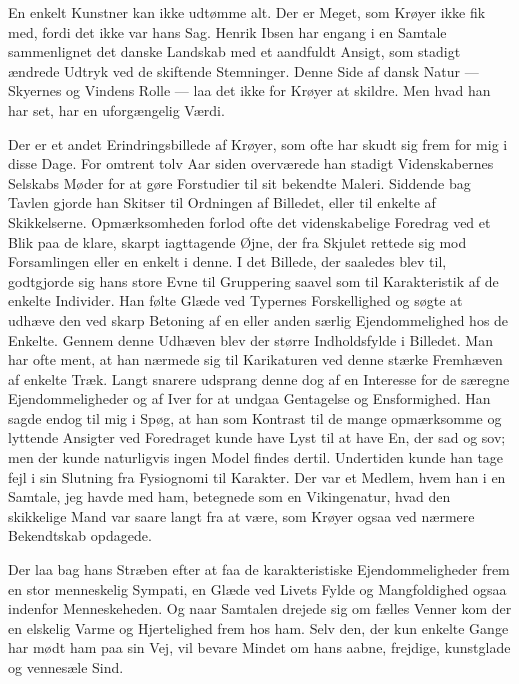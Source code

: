 \documentclass[12pt,a4paper,openany]{book}
\newcommand{\opage}[1]{\marginnote{\footnotesize\textit{[#1]}}}
\begin{document}
En enkelt Kunstner kan ikke udtømme alt. Der er Meget,
som Krøyer ikke fik med, fordi det ikke var hans Sag. Henrik
Ibsen har engang i en Samtale sammenlignet det danske Landskab
med et aandfuldt Ansigt, som stadigt ændrede Udtryk ved
de skiftende Stemninger. Denne Side af dansk Natur --- Skyernes
og Vindens Rolle --- laa det ikke for Krøyer at skildre.
Men hvad han har set, har en uforgængelig Værdi.

\setcounter{footnote}{0}%
\opage{200}Der er et andet Erindringsbillede af Krøyer, som ofte har
skudt sig frem for mig i disse Dage. For omtrent tolv Aar
siden overværede han stadigt Videnskabernes Selskabs Møder
for at gøre Forstudier til sit bekendte Maleri. Siddende bag
Tavlen gjorde han Skitser til Ordningen af Billedet, eller til
enkelte af Skikkelserne. Opmærksomheden forlod ofte det
videnskabelige Foredrag ved et Blik paa de klare, skarpt iagttagende
Øjne, der fra Skjulet rettede sig mod Forsamlingen
eller en enkelt i denne. I det Billede, der saaledes blev til,
godtgjorde sig hans store Evne til Gruppering saavel som til
Karakteristik af de enkelte Individer. Han følte Glæde ved
Typernes Forskellighed og søgte at udhæve den ved skarp Betoning
af en eller anden særlig Ejendommelighed hos de Enkelte.
Gennem denne Udhæven blev der større Indholdsfylde
i Billedet. Man har ofte ment, at han nærmede sig til Karikaturen
ved denne stærke Fremhæven af enkelte Træk. Langt
snarere udsprang denne dog af en Interesse for de særegne
Ejendommeligheder og af Iver for at undgaa Gentagelse og
Ensformighed. Han sagde endog til mig i Spøg, at han som
Kontrast til de mange opmærksomme og lyttende Ansigter ved
Foredraget kunde have Lyst til at have En, der sad og sov;
men der kunde naturligvis ingen Model findes dertil. Undertiden
kunde han tage fejl i sin Slutning fra Fysiognomi til
Karakter. Der var et Medlem, hvem han i en Samtale, jeg
havde med ham, betegnede som en Vikingenatur, hvad den
skikkelige Mand var saare langt fra at være, som Krøyer ogsaa
ved nærmere Bekendtskab opdagede.

Der laa bag hans Stræben efter at faa de karakteristiske
Ejendommeligheder frem en stor menneskelig Sympati, en Glæde
ved Livets Fylde og Mangfoldighed ogsaa indenfor Menneskeheden.
Og naar Samtalen drejede sig om fælles Venner kom
der en elskelig Varme og Hjertelighed frem hos ham. Selv
den, der kun enkelte Gange har mødt ham paa sin Vej, vil
bevare Mindet om hans aabne, frejdige, kunstglade og vennesæle
Sind.
\end{document}
